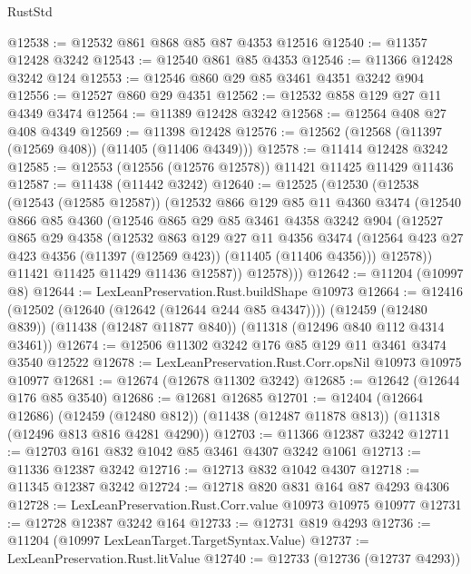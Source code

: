 \begin{lexlean}{RustStd}
\begin{coremodule}
@12538 := @12532 @861 @868 @85 @87 @4353 @12516
@12540 := @11357 @12428 @3242
@12543 := @12540 @861 @85 @4353
@12546 := @11366 @12428 @3242 @124
@12553 := @12546 @860 @29 @85 @3461 @4351 @3242 @904
@12556 := @12527 @860 @29 @4351
@12562 := @12532 @858 @129 @27 @11 @4349 @3474
@12564 := @11389 @12428 @3242
@12568 := @12564 @408 @27 @408 @4349
@12569 := @11398 @12428
@12576 := @12562 (@12568 (@11397 (@12569 @408)) (@11405 (@11406 @4349)))
@12578 := @11414 @12428 @3242
@12585 := @12553 (@12556 (@12576 @12578)) @11421 @11425 @11429 @11436
@12587 := @11438 (@11442 @3242)
@12640 := @12525
    (@12530
      (@12538
        (@12543 (@12585 @12587))
        (@12532
          @866
          @129
          @85
          @11
          @4360
          @3474
          (@12540
            @866
            @85
            @4360
            (@12546
              @865
              @29
              @85
              @3461
              @4358
              @3242
              @904
              (@12527
                @865
                @29
                @4358
                (@12532
                  @863
                  @129
                  @27
                  @11
                  @4356
                  @3474
                  (@12564 @423 @27 @423 @4356 (@11397 (@12569 @423)) (@11405 (@11406 @4356)))
                  @12578))
              @11421
              @11425
              @11429
              @11436
              @12587))
          @12578)))
@12642 := @11204 (@10997 @8)
@12644 := LexLeanPreservation.Rust.buildShape @10973
@12664 := @12416
    (@12502 (@12640 (@12642 (@12644 @244 @85 @4347))))
    (@12459 (@12480 @839))
    (@11438 (@12487 @11877 @840))
    (@11318 (@12496 @840 @112 @4314 @3461))
@12674 := @12506 @11302 @3242 @176 @85 @129 @11 @3461 @3474 @3540 @12522
@12678 := LexLeanPreservation.Rust.Corr.opsNil @10973 @10975 @10977
@12681 := @12674 (@12678 @11302 @3242)
@12685 := @12642 (@12644 @176 @85 @3540)
@12686 := @12681 @12685
@12701 := @12404
    (@12664 @12686)
    (@12459 (@12480 @812))
    (@11438 (@12487 @11878 @813))
    (@11318 (@12496 @813 @816 @4281 @4290))
@12703 := @11366 @12387 @3242
@12711 := @12703 @161 @832 @1042 @85 @3461 @4307 @3242 @1061
@12713 := @11336 @12387 @3242
@12716 := @12713 @832 @1042 @4307
@12718 := @11345 @12387 @3242
@12724 := @12718 @820 @831 @164 @87 @4293 @4306
@12728 := LexLeanPreservation.Rust.Corr.value @10973 @10975 @10977
@12731 := @12728 @12387 @3242 @164
@12733 := @12731 @819 @4293
@12736 := @11204 (@10997 LexLeanTarget.TargetSyntax.Value)
@12737 := LexLeanPreservation.Rust.litValue
@12740 := @12733 (@12736 (@12737 @4293))

\end{coremodule}
\end{lexlean}
